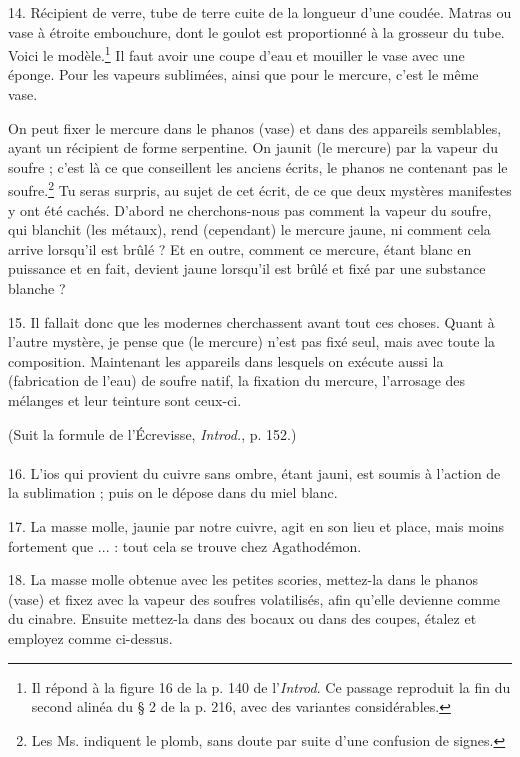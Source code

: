 \documentclass[a4paper, 11pt, oneside, polutonikogreek, french]{article}
\begin{document}
14. Récipient de verre, tube de terre cuite de la longueur d'une coudée. Matras ou vase à étroite embouchure, dont le goulot est proportionné à la grosseur du tube. Voici le modèle.\footnote{Il répond à la figure 16 de la p. 140 de l'\emph{Introd}. Ce passage reproduit la fin du second alinéa du § 2 de la p. 216, avec des variantes considérables.} Il faut avoir une coupe d'eau et mouiller le vase avec une éponge. Pour les vapeurs sublimées, ainsi que pour le mercure, c'est le même vase.

On peut fixer le mercure dans le phanos (vase) et dans des appareils semblables, ayant un récipient de forme serpentine. On jaunit (le mercure) par la vapeur du soufre ; c'est là ce que conseillent les anciens écrits, le phanos ne contenant pas le soufre.\footnote{Les Ms. indiquent le plomb, sans doute par suite d'une confusion de signes.} Tu seras surpris, au sujet de cet écrit, de ce que deux mystères manifestes y ont été cachés. D'abord ne cherchons-nous pas comment la vapeur du soufre, qui blanchit (les métaux), rend (cependant) le mercure jaune, ni comment cela arrive lorsqu'il est brûlé ? Et en outre, comment ce mercure, étant blanc en puissance et en fait, devient jaune lorsqu'il est brûlé et fixé par une substance blanche ?

15. Il fallait donc que les modernes cherchassent avant tout ces choses. Quant à l'autre mystère, je pense que (le mercure) n'est pas fixé seul, mais avec toute la composition. Maintenant les appareils dans lesquels on exécute aussi la (fabrication de l'eau) de soufre natif, la fixation du mercure, l'arrosage des mélanges et leur teinture sont ceux-ci.
\begin{center}
(Suit la formule de l'Écrevisse, \emph{Introd.}, p. 152.)
\end{center}
\paragraph{}
16. L'ios qui provient du cuivre sans ombre, étant jauni, est soumis à l'action de la sublimation ; puis on le dépose dans du miel blanc.

17. La masse molle, jaunie par notre cuivre, agit en son lieu et place, mais moins fortement que ... : tout cela se trouve chez Agathodémon.

18. La masse molle obtenue avec les petites scories, mettez-la dans le phanos (vase) et fixez avec la vapeur des soufres volatilisés, afin qu'elle devienne comme du cinabre. Ensuite mettez-la dans des bocaux ou dans des coupes, étalez et employez comme ci-dessus.
\end{document}
